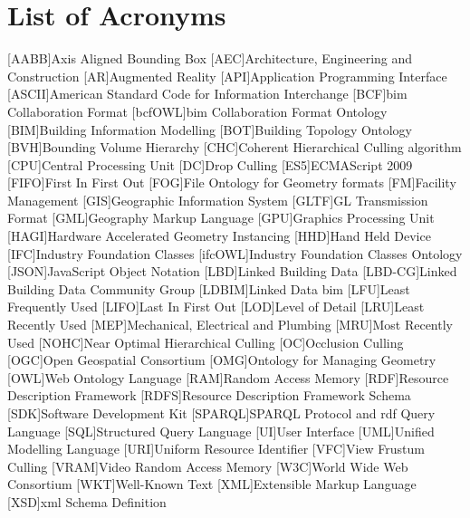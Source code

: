 \documentclass[12pt,a4paper,twoside,openright,faculty=ea,language=en,doctype=report]{settings/ugent-doc}
\begin{document}
{\makeatletter\@openrightfalse
  \hbox{}\newpage
  \hypersetup{hidelinks}

  \tableofcontents
  \listoffigures
  \let\clearpage\relax
  \listoftables
  \listoflistings

  \hbox{}\newpage
  \chapter*{List of Acronyms}
  \begin{acronym}[JSONP]\itemsep2pt
    [AABB]{Axis Aligned Bounding Box}
    [AEC]{Architecture, Engineering and Construction}
    [AR]{Augmented Reality}
    [API]{Application Programming Interface}
    [ASCII]{American Standard Code for Information Interchange}
    [BCF]{\acs{bim} Collaboration Format}
    [bcfOWL]{\acs{bim} Collaboration Format Ontology}
    [BIM]{Building Information Modelling}
    [BOT]{Building Topology Ontology}
    [BVH]{Bounding Volume Hierarchy}
    [CHC]{Coherent Hierarchical Culling algorithm}
    [CPU]{Central Processing Unit}
    [DC]{Drop Culling}
    [ES5]{ECMAScript 2009}
    [FIFO]{First In First Out}
    [FOG]{File Ontology for Geometry formats}
    [FM]{Facility Management}
    [GIS]{Geographic Information System}
    [GLTF]{GL Transmission Format}
    [GML]{Geography Markup Language}
    [GPU]{Graphics Processing Unit}
    [HAGI]{Hardware Accelerated Geometry Instancing}
    [HHD]{Hand Held Device}
    [IFC]{Industry Foundation Classes}
    [ifcOWL]{Industry Foundation Classes Ontology}
    [JSON]{JavaScript Object Notation}
    [LBD]{Linked Building Data}
    [LBD-CG]{Linked Building Data Community Group}
    [LDBIM]{Linked Data \acs{bim}}
    [LFU]{Least Frequently Used}
    [LIFO]{Last In First Out}
    [LOD]{Level of Detail}
    [LRU]{Least Recently Used}
    [MEP]{Mechanical, Electrical and Plumbing}
    [MRU]{Most Recently Used}
    [NOHC]{Near Optimal Hierarchical Culling}
    [OC]{Occlusion Culling}
    [OGC]{Open Geospatial Consortium}
    [OMG]{Ontology for Managing Geometry}
    [OWL]{Web Ontology Language}
    [RAM]{Random Access Memory}
    [RDF]{Resource Description Framework}
    [RDFS]{Resource Description Framework Schema}
    [SDK]{Software Development Kit}
    [SPARQL]{SPARQL Protocol and \acs{rdf} Query Language}
    [SQL]{Structured Query Language}
    [UI]{User Interface}
    [UML]{Unified Modelling Language}
    [URI]{Uniform Resource Identifier}
    [VFC]{View Frustum Culling}
    [VRAM]{Video Random Access Memory}
    [W3C]{World Wide Web Consortium}
    [WKT]{Well-Known Text}
    [XML]{Extensible Markup Language}
    [XSD]{\ac{xml} Schema Definition}
  \end{acronym}
}
\end{document}
